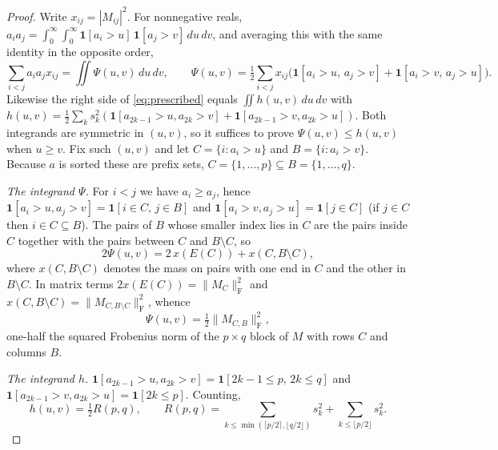 \documentclass[11pt]{article}
\newcommand{\F}{\mathrm F}
\begin{document}
\begin{proof}
Write $x_{ij}=|M_{ij}|^2$. For nonnegative reals,
$a_ia_j=\int_0^\infty\!\!\int_0^\infty\mathbf1[a_i>u]\,\mathbf1[a_j>v]\,du\,dv$,
and averaging this with the same identity in the opposite order,
\begin{equation}\label{eq:layer}
\sum_{i<j}a_ia_jx_{ij}=\iint\Psi(u,v)\,du\,dv,\qquad
\Psi(u,v)=\tfrac12\sum_{i<j}x_{ij}\Big(\mathbf1[a_i>u,\,a_j>v]+\mathbf1[a_i>v,\,a_j>u]\Big).
\end{equation}
Likewise the right side of \eqref{eq:prescribed} equals $\iint h(u,v)\,du\,dv$
with $h(u,v)=\frac12\sum_ks_k^2(\mathbf1[a_{2k-1}>u,a_{2k}>v]+\mathbf1[a_{2k-1}>v,a_{2k}>u])$.
Both integrands are symmetric in $(u,v)$, so it suffices to prove
$\Psi(u,v)\le h(u,v)$ when $u\ge v$. Fix such $(u,v)$ and let
$C=\{i:a_i>u\}$ and $B=\{i:a_i>v\}$. Because $a$ is sorted these are prefix
sets, $C=\{1,\dots,p\}\subseteq B=\{1,\dots,q\}$.

\emph{The integrand $\Psi$.} For $i<j$ we have $a_i\ge a_j$, hence
$\mathbf1[a_i>u,a_j>v]=\mathbf1[i\in C,\,j\in B]$ and
$\mathbf1[a_i>v,a_j>u]=\mathbf1[j\in C]$ (if $j\in C$ then $i\in C\subseteq B$).
The pairs of $B$ whose smaller index lies in $C$ are the pairs inside $C$
together with the pairs between $C$ and $B\setminus C$, so
\[
2\Psi(u,v)=2\,x(E(C))+x(C,B\setminus C),
\]
where $x(C,B\setminus C)$ denotes the mass on pairs with one end in $C$ and
the other in $B\setminus C$. In matrix terms $2x(E(C))=\|M_C\|_\F^2$ and
$x(C,B\setminus C)=\|M_{C,B\setminus C}\|_\F^2$, whence
\begin{equation}\label{eq:psi}
\Psi(u,v)=\tfrac12\|M_{C,B}\|_\F^2,
\end{equation}
one-half the squared Frobenius norm of the $p\times q$ block of $M$ with rows
$C$ and columns $B$.

\emph{The integrand $h$.} $\mathbf1[a_{2k-1}>u,a_{2k}>v]=\mathbf1[2k-1\le p,\,2k\le q]$
and $\mathbf1[a_{2k-1}>v,a_{2k}>u]=\mathbf1[2k\le p]$. Counting,
\begin{equation}\label{eq:h}
h(u,v)=\tfrac12R(p,q),\qquad
R(p,q)=\sum_{k\le\min(\lceil p/2\rceil,\lfloor q/2\rfloor)}s_k^2+\sum_{k\le\lfloor p/2\rfloor}s_k^2 .
\end{equation}


\end{proof}
\end{document}
